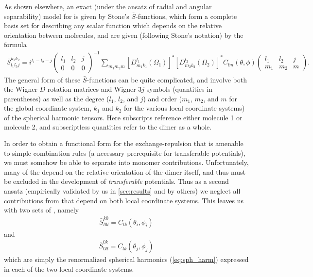 As shown elsewhere,\cite{Stone1978,Stone1984}
an exact (under the ansatz of
radial and angular separability) model for \gij is given by Stone's $\bar{S}$-functions, 
which form a complete basis set for describing any scalar function which
depends on the relative orientation
between molecules, and are given (following Stone's
notation\cite{stone2013theory}) by the formula
\begin{align}
%
\bar{S}^{k_1 k_2}_{l_1 l_2 j} = 
i^{l_1 - l_2 -j}
\begin{pmatrix} l_1 & l_2 & j \\ 0 & 0 & 0 \end{pmatrix}^{-1}
\sum \limits_{m_1 m_2 m} 
[D^{l_1}_{m_1 k_1}(\Omega_1)]^*
[D^{l_2}_{m_2 k_2}(\Omega_2)]^*
C_{lm}(\theta,\phi)
\begin{pmatrix} l_1 & l_2 & j \\ m_1 & m_2 & m \end{pmatrix}.
%
\end{align}
The general form of these $\bar{S}$-functions can be quite complicated, and
involve both the Wigner $D$ rotation matrices and Wigner $3j$-symbols (quantities
in parentheses) as well as the degree ($l_1$, $l_2$, and $j$) and order
($m_1$, $m_2$, and $m$ for the global coordinate system, $k_1$ and $k_2$ for the
various local coordinate systems) of the spherical harmonic tensors. Here
subscripts reference either molecule 1 or molecule 2, and subscriptless
quantities refer to the dimer as a whole.

In order to obtain a functional form for the exchange-repulsion that is
amenable to simple combination rules (a necessary prerequisite for
transferable potentials), we must somehow be able to separate \gij into monomer
contributions. Unfortunately, many of the \sfunc depend on the relative
orientation of the dimer itself, and thus must be excluded in the development
of \emph{transferable} potentials.
Thus as a second ansatz (empirically validated by us in \cref{sec:results} and by
others\cite{Millot1992})
we neglect all contributions from \sfunc that depend
on both local coordinate systems. This leaves us with two sets of \sfunc, namely
%
\begin{align}
\bar{S}^{k0}_{l0l} = C_{lk}(\theta_i,\phi_i)
\end{align}
%
and
%
\begin{align}
\bar{S}^{0k}_{0ll} = C_{lk}(\theta_j,\phi_j)
\end{align}
%
which are simply the renormalized spherical harmonics (\cref{eq:sph_harm})
expressed in each of the two local coordinate systems.

